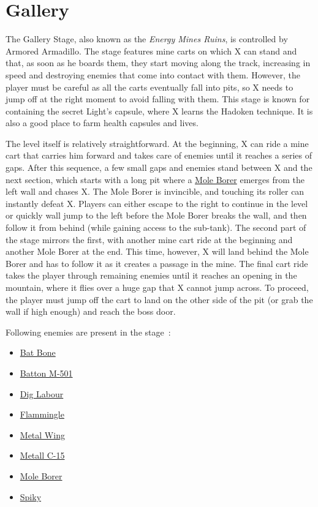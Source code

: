 \section{Gallery}
The Gallery Stage, also known as the \textit{Energy Mines Ruins}, is controlled by Armored Armadillo. The stage features mine carts on which X can stand and that, as soon as he boards them, they start moving along the track, increasing in speed and destroying enemies that come into contact with them. However, the player must be careful as all the carts eventually fall into pits, so X needs to jump off at the right moment to avoid falling with them. This stage is known for containing the secret Light's capsule, where X learns the Hadoken technique. It is also a good place to farm health capsules and lives.

The level itself is relatively straightforward. At the beginning, X can ride a mine cart that carries him forward and takes care of enemies until it reaches a series of gaps. After this sequence, a few small gaps and enemies stand between X and the next section, which starts with a long pit where a \hyperlink{miniboss:Mole_Borer}{Mole Borer} emerges from the left wall and chases X. The Mole Borer is invincible, and touching its roller can instantly defeat X. Players can either escape to the right to continue in the level or quickly wall jump to the left before the Mole Borer breaks the wall, and then follow it from behind (while gaining access to the sub-tank). The second part of the stage mirrors the first, with another mine cart ride at the beginning and another Mole Borer at the end. This time, however, X will land behind the Mole Borer and has to follow it as it creates a passage in the mine. The final cart ride takes the player through remaining enemies until it reaches an opening in the mountain, where it flies over a huge gap that X cannot jump across. To proceed, the player must jump off the cart to land on the other side of the pit (or grab the wall if high enough) and reach the boss door.

Following enemies are present in the stage~\cite{wiki:Gallery}:
\begin{itemize}
	\item \hyperlink{enem:Batton_Bone}{Bat Bone} 
	\item \hyperlink{enem:Batton_M-501}{Batton M-501} 
	\item \hyperlink{enem:Dig_Labour}{Dig Labour} 
	\item \hyperlink{enem:Flammingle}{Flammingle} 
	\item \hyperlink{enem:Metal_Wing}{Metal Wing} 
	\item \hyperlink{enem:Metall_C-15}{Metall C-15} 
	\item \hyperlink{miniboss:Mole_Borer}{Mole Borer}
	\item \hyperlink{enem:Spiky}{Spiky}
\end{itemize}

